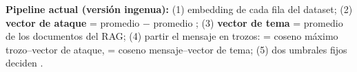 
\begin{callout}[algo]
\textbf{Pipeline actual (versión ingenua):} (1) embedding de cada fila del dataset; (2) \textbf{vector de ataque} = promedio  − promedio ; (3) \textbf{vector de tema} = promedio de los documentos del RAG; (4) partir el mensaje en trozos:  = coseno máximo trozo–vector de ataque,  = coseno mensaje–vector de tema; (5) dos umbrales fijos deciden \Verdicts.
\end{callout}

